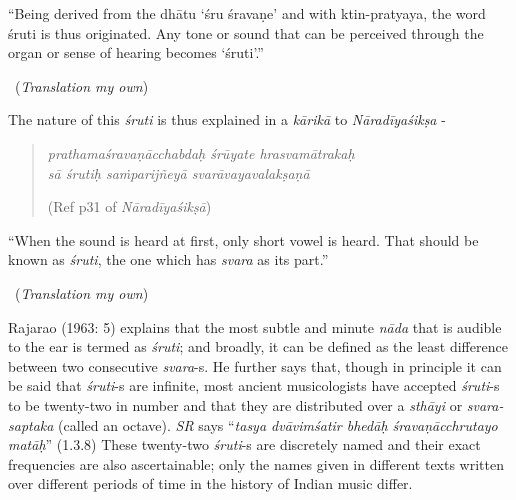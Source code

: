 \begin{myquote}
“Being derived from the dhātu ‘śru śravaṇe’ and with ktin-pratyaya, the word śruti is thus originated. Any tone or sound that can be perceived through the organ or sense of hearing becomes ‘śruti’.” 

~\hfill (\textit{Translation my own})
\end{myquote}

The nature of this \textit{śruti} is thus explained in a \textit{kārikā} to \textit{Nāradīyaśikṣa} -

\begin{verse}
\textit{prathamaśravaṇācchabdaḥ śrūyate hrasvamātrakaḥ }\\ \textit{sā śrutiḥ saṁparijñeyā svarāvayavalakṣaṇā  } 
\begin{flushright}
(Ref p31 of \textit{Nāradīyaśikṣā})
\end{flushright}
\end{verse}

\begin{myquote}
“When the sound is heard at first, only short vowel is heard. That should be known as \textit{śruti}, the one which has \textit{svara} as its part.” 

~\hfill (\textit{Translation my own})
\end{myquote}

Rajarao (1963: 5) explains that the most subtle and minute \textit{nāda} that is audible to the ear is termed as \textit{śruti}; and broadly, it can be defined as the least difference between two consecutive \textit{svara}-s. He further says that, though in principle it can be said that \textit{śruti}-s are infinite, most ancient musicologists have accepted \textit{śruti}-s to be twenty-two in number and that they are distributed over a \textit{sthāyi} or \textit{svara-saptaka} (called an octave). \textit{SR} says “\textit{tasya dvāvimśatir bhedāḥ śravaṇācchrutayo matāḥ}” (1.3.8) These twenty-two \textit{śruti}-s are discretely named and their exact frequencies are also ascertainable; only the names given in different texts written over different periods of time in the history of Indian music differ.

